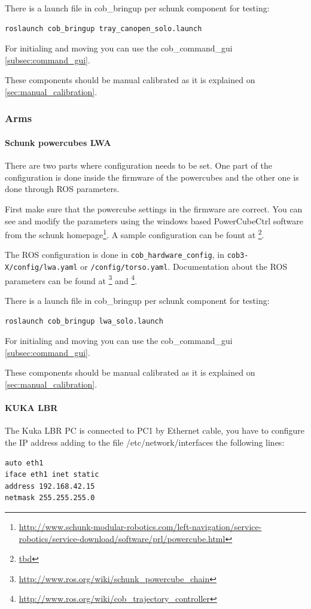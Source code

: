 There is a launch file in cob\_bringup per schunk component for testing:

\begin{lstlisting}
roslaunch cob_bringup tray_canopen_solo.launch
\end{lstlisting}

For initialing and moving you can use the cob\_command\_gui \ref{subsec:command_gui}.

These components should be manual calibrated as it is explained on \ref{sec:manual_calibration}.

\subsubsection{Arms}


\paragraph{Schunk powercubes LWA}
There are two parts where configuration needs to be set. One part of the configuration is done inside the firmware of the powercubes and the other one is done through ROS parameters.

First make sure that the powercube settings in the firmware are correct. You can see and modify the parameters using the windows based PowerCubeCtrl software from the schunk homepage\footnote{\url{http://www.schunk-modular-robotics.com/left-navigation/service-robotics/service-download/software/prl/powercube.html}}. A sample configuration can be fount at \footnote{\url{tbd}}.

The ROS configuration is done in \texttt{cob\_hardware\_config}, in \texttt{cob3-X/config/lwa.yaml} or \texttt{/config/torso.yaml}. Documentation about the ROS parameters can be found at \footnote{\url{http://www.ros.org/wiki/schunk_powercube_chain}} and \footnote{\url{http://www.ros.org/wiki/cob_trajectory_controller}}.

There is a launch file in cob\_bringup per schunk component for testing:

\begin{lstlisting}
roslaunch cob_bringup lwa_solo.launch
\end{lstlisting}

For initialing and moving you can use the cob\_command\_gui \ref{subsec:command_gui}.

These components should be manual calibrated as it is explained on \ref{sec:manual_calibration}.

\paragraph{KUKA LBR}
The Kuka LBR PC is connected to PC1 by Ethernet cable, you have to configure the IP address adding to the file /etc/network/interfaces the following lines:
\begin{lstlisting}
auto eth1
iface eth1 inet static
address 192.168.42.15
netmask 255.255.255.0
\end{lstlisting}

